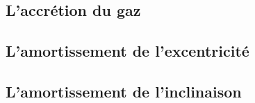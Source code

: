 \documentclass[a4paper,twoside]{article}
\begin{document}
\subsection{L'accrétion du gaz}

\subsection{L'amortissement de l'excentricité}%

\subsection{L'amortissement de l'inclinaison}%








\end{document}
